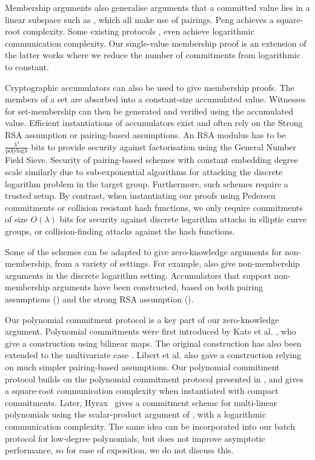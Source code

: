 Membership arguments also generalise arguments that a committed value lies in a linear subspace such as \cite{Jutla2013,Jutla2014,Kiltz2015}, which all make use of pairings. Peng \cite{Peng2012} achieves a square-root complexity. Some existing protocols \cite{BayerG13}, \cite{GrothK15} even achieve logarithmic communication complexity. Our single-value membership proof is an extension of the latter works where we reduce the number of commitments from logarithmic to constant.

Cryptographic accumulators \cite{Benaloh1994,Ngu05,Camenisch2009,Camenisch2002} can also be used to give membership proofs. The members of a set are absorbed into a constant-size accumulated value. Witnesses for set-membership can then be generated and verified using the accumulated value. Efficient instantiations of accumulators exist and often rely on the Strong RSA assumption or pairing-based assumptions. An RSA modulus has to be $\frac{\lambda^3}{\mathrm{polylog}\lambda}$ bits to provide security against factorisation using the General Number Field Sieve. Security of pairing-based schemes with constant embedding degree scale similarly due to sub-exponential algorithms for attacking the discrete logarithm problem in the target group. Furthermore, such schemes require a trusted setup. By contrast, when instantiating our proofs using Pedersen commitments or collision resistant hash functions, we only require commitments of size $O(\lambda)$ bits for security against discrete logarithm attacks in elliptic curve groups, or collision-finding attacks against the hash functions.

Some of the schemes can be adapted to give zero-knowledge arguments for non-membership, from a variety of settings. For example, \cite{BayerG13,Peng2012} also give non-membership arguments in the discrete logarithm setting. Accumulators that support non-membership arguments have been constructed, based on both pairing assumptions (\cite{Damgard2008}) and the strong RSA assumption (\cite{Li2007}).

Our polynomial commitment protocol is a key part of our zero-knowledge argument. Polynomial commitments were first introduced by Kate et al. \cite{KateZG10}, who give a construction using bilinear maps. The original construction has also been extended to the multivariate case \cite{PapamanthouST13,ZhangGKPP17}. Libert et al. \cite{LibertRY16} also gave a construction relying on much simpler pairing-based assumptions. Our polynomial commitment protocol builds on the polynomial commitment protocol presented in \cite{BootleCCGP16}, and gives a square-root communication complexity when instantiated with compact commitments. Later, Hyrax~\cite{WahbyTSTW18} gives a commitment scheme for multi-linear polynomials using the scalar-product argument of \cite{BootleCCGP16,BunzBBPWM18}, with a logarithmic communication complexity. The same idea can be incorporated into our batch protocol for low-degree polynomials, but does not improve asymptotic performance, so for ease of exposition, we do not discuss this.

